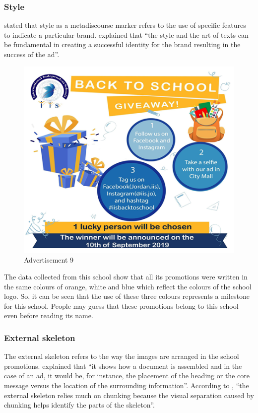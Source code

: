 \documentclass[english]{textolivre}
\begin{document}
\subsubsection{Style}\label{sec-format-simple}
\textcite{kumpf_visual_2000} stated that style as a metadiscourse marker refers to the use of specific features to indicate a particular brand. \textcite[p.~36]{al-subhi_metadiscourse_2022} explained that “the style and the art of texts can be fundamental in creating a successful identity for the brand resulting in the success of the ad”.

\begin{figure}[htbp]
\centering
\begin{minipage}{0.5\textwidth}
\includegraphics[width=\linewidth]{Fig9.png}
\caption{Advertisement 9}
\label{fig9}
\end{minipage}
\end{figure}

The data collected from this school show that all its promotions were written in the same colours of orange, white and blue which reflect the colours of the school logo. So, it can be seen that the use of these three colours represents a milestone for this school. People may guess that these promotions belong to this school even before reading its name.

\subsubsection{External skeleton}\label{sec-links}
The external skeleton refers to the way the images are arranged in the school promotions. \textcite[p.~32]{al-subhi_metadiscourse_2022} explained that “it shows how a document is assembled and in the case of an ad, it would be, for instance, the placement of the heading or the core message versus the location of the surrounding information”. According to \textcite[p.~411]{kumpf_visual_2000}, “the external skeleton relies much on chunking because the visual separation caused by chunking helps identify the parts of the skeleton”.
\end{document}
